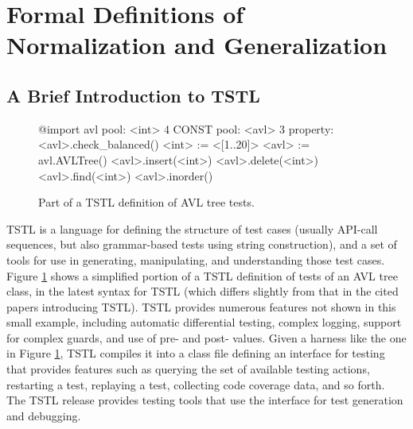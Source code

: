 \section{Formal Definitions of Normalization and Generalization}

\subsection{A Brief Introduction to TSTL}

\begin{figure}
{\scriptsize
\begin{code}
@import avl
\vspace{0.05in}
pool: <int> 4 CONST
pool: <avl> 3
\vspace{0.05in}
property: <avl>.check\_balanced()
\vspace{0.05in}
<int> := <[1..20]>
<avl> := avl.AVLTree()
\vspace{0.05in}
<avl>.insert(<int>)
<avl>.delete(<int>)
<avl>.find(<int>)
<avl>.inorder()
\end{code}
}
\caption{Part of a TSTL definition of AVL tree tests.}
\label{fig:example}
\end{figure}


TSTL \cite{NFM15,ISSTA15} is a language for defining the structure of
test cases (usually API-call sequences, but also grammar-based tests using
string construction), and a set of tools for use in generating,
manipulating, and understanding those test cases.  Figure
\ref{fig:example} shows a simplified portion of a TSTL definition of
tests of an AVL tree class, in the latest syntax for TSTL (which
differs slightly from that in the cited papers introducing TSTL).
TSTL provides numerous features not shown in this small example,
including automatic differential testing, complex logging, support for
complex guards, and use of pre- and post- values.  Given a harness
like the one in Figure \ref{fig:example}, TSTL compiles it into a
class file defining an interface for testing that provides features
such as querying the set of available testing actions, restarting a
test, replaying a test, collecting code coverage data, and so forth.
The TSTL release \cite{tstl} provides testing tools that use the
interface for test generation and debugging.

